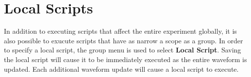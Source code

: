 \section{Local Scripts}
In addition to executing scripts that affect the entire experiment globally, it
is also possible to exucute scripts that have as narrow a scope as a group.  In
order to specify a local script, the group menu is used to select \textbf{Local
Script}.  Saving the local script will cause it to be immediately executed as
the entire waveform is updated.  Each additional waveform update will cause a
local script to execute.
